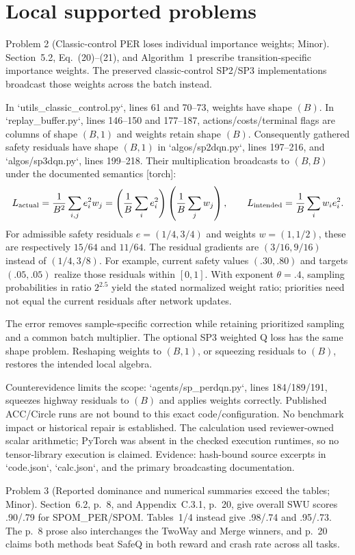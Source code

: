 \documentclass[10pt]{article}
\begin{document}
\section*{Local supported problems}
Problem 2 (Classic-control PER loses individual importance weights; Minor).  Section 5.2, Eq. (20)–(21), and Algorithm 1 prescribe transition-specific importance weights. The preserved classic-control SP2/SP3 implementations broadcast those weights across the batch instead.\par
In `utils\_classic\_control.py`, lines 61 and 70–73, weights have shape \((B)\). In `replay\_buffer.py`, lines 146–150 and 177–187, actions/costs/terminal flags are columns of shape \((B,1)\) and weights retain shape \((B)\). Consequently gathered safety residuals have shape \((B,1)\) in `algos/sp2dqn.py`, lines 197–216, and `algos/sp3dqn.py`, lines 199–218. Their multiplication broadcasts to \((B,B)\) under the documented semantics [torch]: \[L_{\rm actual}=\frac1{B^2}\sum_{i,j}e_i^2w_j
 =\left(\frac1B\sum_i e_i^2\right)\left(\frac1B\sum_jw_j\right),
 \qquad
 L_{\rm intended}=\frac1B\sum_iw_i e_i^2.\] For admissible safety residuals \(e=(1/4,3/4)\) and weights \(w=(1,1/2)\), these are respectively \(15/64\) and \(11/64\). The residual gradients are \((3/16,9/16)\) instead of \((1/4,3/8)\). For example, current safety values \((.30,.80)\) and targets \((.05,.05)\) realize those residuals within \([0,1]\). With exponent \(\theta=.4\), sampling probabilities in ratio \(2^{2.5}\) yield the stated normalized weight ratio; priorities need not equal the current residuals after network updates.\par
The error removes sample-specific correction while retaining prioritized sampling and a common batch multiplier. The optional SP3 weighted Q loss has the same shape problem. Reshaping weights to \((B,1)\), or squeezing residuals to \((B)\), restores the intended local algebra.\par
Counterevidence limits the scope: `agents/sp\_perdqn.py`, lines 184/189/191, squeezes highway residuals to \((B)\) and applies weights correctly. Published ACC/Circle runs are not bound to this exact code/configuration. No benchmark impact or historical repair is established. The calculation used reviewer-owned scalar arithmetic; PyTorch was absent in the checked execution runtimes, so no tensor-library execution is claimed. Evidence: hash-bound source excerpts in `code.json`, `calc.json`, and the primary broadcasting documentation.\par
Problem 3 (Reported dominance and numerical summaries exceed the tables; Minor).  Section 6.2, p. 8, and Appendix C.3.1, p. 20, give overall SWU scores .90/.79 for SPOM\_PER/SPOM. Tables 1/4 instead give .98/.74 and .95/.73. The p. 8 prose also interchanges the TwoWay and Merge winners, and p. 20 claims both methods beat SafeQ in both reward and crash rate across all tasks.\par
\end{document}
